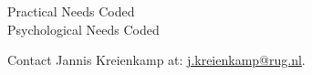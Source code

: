 \faSquareO \vspace{1em} Practical Needs Coded\\
\faSquareO \vspace{1em} Psychological Needs Coded



\divider

\divider

\divider

\divider

\divider

\divider

\divider

\divider





Contact Jannis Kreienkamp at: \href{mailto:j.kreienkamp@rug.nl}{j.kreienkamp@rug.nl}.

